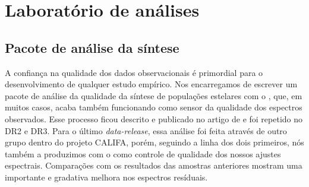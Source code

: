 

\chapter{Laboratório de análises}
\label{apendice:lab}

\section{Pacote de análise da síntese}
 \label{apendice:lab:syntpack}

A confiança na qualidade dos dados observacionais é primordial para o desenvolvimento de qualquer estudo empírico. Nos encarregamos de escrever um pacote de análise da qualidade da síntese de populações estelares com o \starlight, que, em muitos casos, acaba também funcionando como sensor da qualidade dos espectros observados. Esse processo ficou descrito e publicado no artigo de \citet[][DR1]{Husemann.etal.2013a} e foi repetido no DR2 e DR3. Para o último {\em data-release}, essa análise foi feita através de outro grupo dentro do projeto CALIFA, porém, seguindo a linha dos dois primeiros, nós também a produzimos com o \starlight como controle de qualidade dos nossos ajustes espectrais. Comparações com os resultados das amostras anteriores mostram uma importante e gradativa melhora nos espectros resíduais.

